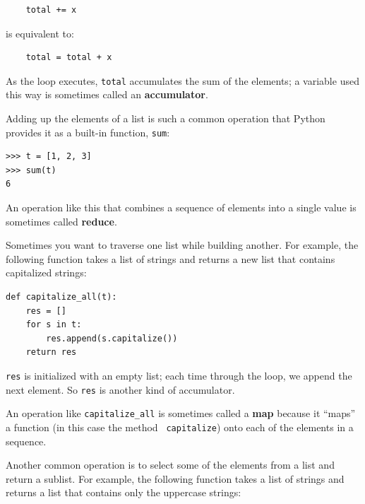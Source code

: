 \documentclass[10pt]{book}
\begin{document}

\beforeverb
\begin{verbatim}
    total += x
\end{verbatim}
\afterverb
%
is equivalent to:

\beforeverb
\begin{verbatim}
    total = total + x
\end{verbatim}
\afterverb
%
As the loop executes, {\tt total} accumulates the sum of the
elements; a variable used this way is sometimes called an
{\bf accumulator}.


Adding up the elements of a list is such a common operation
that Python provides it as a built-in function, {\tt sum}:

\beforeverb
\begin{verbatim}
>>> t = [1, 2, 3]
>>> sum(t)
6
\end{verbatim}
\afterverb
%
An operation like this that combines a sequence of elements into
a single value is sometimes called {\bf reduce}.


Sometimes you want to traverse one list while building
another.  For example, the following function takes a list of strings
and returns a new list that contains capitalized strings:

\beforeverb
\begin{verbatim}
def capitalize_all(t):
    res = []
    for s in t:
        res.append(s.capitalize())
    return res
\end{verbatim}
\afterverb
%
{\tt res} is initialized with an empty list; each time through
the loop, we append the next element.  So {\tt res} is another
kind of accumulator.


An operation like \verb"capitalize_all" is sometimes called a {\bf
map} because it ``maps'' a function (in this case the method {\tt
capitalize}) onto each of the elements in a sequence.


Another common operation is to select some of the elements from
a list and return a sublist.  For example, the following
function takes a list of strings and returns a list that contains
only the uppercase strings:
\end{document}
